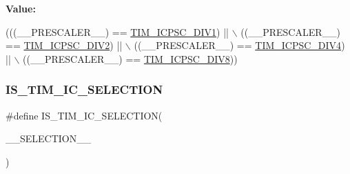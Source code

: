 {\bfseries Value\+:}
\begin{DoxyCode}
(((\_\_PRESCALER\_\_) == \hyperlink{group___t_i_m___input___capture___prescaler_ga8acb44abe3147d883685c1f9f1ce410e}{TIM\_ICPSC\_DIV1}) || \(\backslash\)
                                            ((\_\_PRESCALER\_\_) == \hyperlink{group___t_i_m___input___capture___prescaler_ga1d8a7b66add914e2ddd910d2d700978f}{TIM\_ICPSC\_DIV2}) || \(\backslash\)
                                            ((\_\_PRESCALER\_\_) == \hyperlink{group___t_i_m___input___capture___prescaler_gaf5a675046430fa0f0c95b0dac612828f}{TIM\_ICPSC\_DIV4}) || \(\backslash\)
                                            ((\_\_PRESCALER\_\_) == \hyperlink{group___t_i_m___input___capture___prescaler_ga5086cb03c89a5c67b199d20b605f00cb}{TIM\_ICPSC\_DIV8}))
\end{DoxyCode}
\mbox{\label{group___t_i_m___private___macros_ga3b370e1454433066201e9f09cb47173f}} 
\subsubsection{\texorpdfstring{I\+S\+\_\+\+T\+I\+M\+\_\+\+I\+C\+\_\+\+S\+E\+L\+E\+C\+T\+I\+ON}{IS\_TIM\_IC\_SELECTION}}
{\footnotesize\ttfamily \#define I\+S\+\_\+\+T\+I\+M\+\_\+\+I\+C\+\_\+\+S\+E\+L\+E\+C\+T\+I\+ON(\begin{DoxyParamCaption}\item[{}]{\+\_\+\+\_\+\+S\+E\+L\+E\+C\+T\+I\+O\+N\+\_\+\+\_\+ }\end{DoxyParamCaption})}

